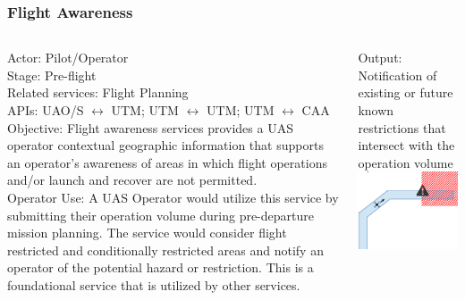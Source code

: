 \documentclass[usenames,dvipsnames,aspectratio=169,serif]{beamer}
\begin{document}
\begin{frame}
\begin{columns}[T]
\begin{column}{0.25\textwidth}
      \end{column}
   \end{columns}
\end{frame}


\begin{frame}
   \frametitle{Flight Awareness}
   \begin{columns}[T]
      \begin{column}{0.5\textwidth}
         Actor: Pilot/Operator \\
         Stage: Pre-flight \\
         Related services: Flight Planning \\
         APIs: UAO/S $\leftrightarrow$ UTM; UTM $\leftrightarrow$ UTM; UTM $\leftrightarrow$ CAA \\
         Objective: Flight awareness services provides a UAS operator contextual geographic information that supports an operator's awareness of areas in which flight operations and/or launch and recover are not permitted.  \\
         Operator Use: A UAS Operator would utilize this service by submitting their operation volume during pre-departure mission planning. The service would consider flight restricted and conditionally restricted areas and notify an operator of the potential hazard or restriction. This is a foundational service that is utilized by other services.
      \end{column}
      \begin{column}{0.5\textwidth}
         Output: Notification of existing or future known restrictions that intersect with the operation volume \\
         \includegraphics[height=0.45\textwidth]{img/flight-awareness.png}
      \end{column}
   \end{columns}
\end{frame}
\end{document}
